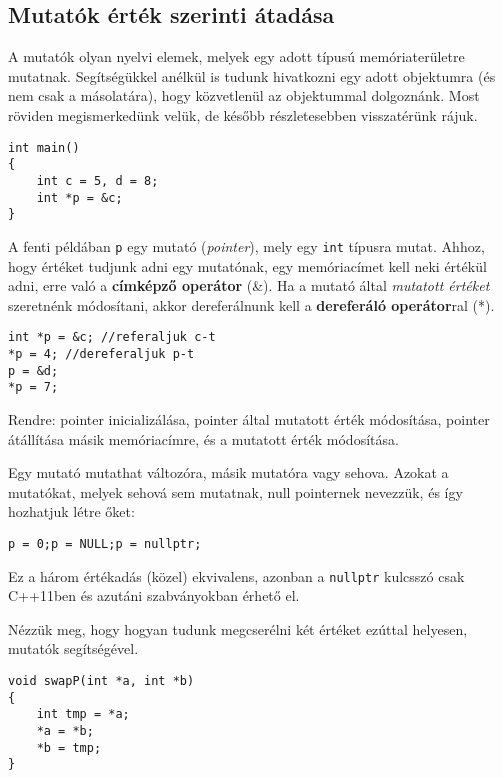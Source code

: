 \documentclass[a4paper,11.5pt]{article}
\begin{document}
	\subsection{Mutatók érték szerinti átadása}
	A mutatók olyan nyelvi elemek, melyek egy adott típusú memóriaterületre mutatnak. Segítségükkel anélkül is tudunk hivatkozni egy adott objektumra (és nem csak a másolatára), hogy közvetlenül az objektummal dolgoznánk. Most röviden megismerkedünk velük, de később részletesebben visszatérünk rájuk.
	\begin{lstlisting}
int main()
{
	int c = 5, d = 8;
	int *p = &c;
}
	\end{lstlisting}
	A fenti példában \texttt{p} egy mutató (\textit{pointer}), mely egy \texttt{int} típusra mutat. Ahhoz, hogy értéket tudjunk adni egy mutatónak, egy memóriacímet kell neki értékül adni, erre való a \textbf{címképző operátor} (\&). Ha a mutató által \textit{mutatott értéket} szeretnénk módosítani, akkor dereferálnunk kell a \textbf{dereferáló operátor}ral (*).
	\begin{lstlisting}
int *p = &c; //referaljuk c-t
*p = 4; //dereferaljuk p-t
p = &d;
*p = 7;
	\end{lstlisting}
	Rendre: pointer inicializálása, pointer által mutatott érték módosítása, pointer átállítása másik memóriacímre, és a mutatott érték módosítása.
	
	Egy mutató mutathat változóra, másik mutatóra vagy sehova. Azokat a mutatókat, melyek sehová sem mutatnak, null pointernek nevezzük, és így hozhatjuk létre őket:
	
	{\centering \texttt{p = 0;\quad \quad p = NULL;\quad \quad p = nullptr;} \par}
	
	\begin{note}
		Ez a három értékadás (közel) ekvivalens, azonban a \texttt{nullptr} kulcsszó csak C++11ben és azutáni szabványokban érhető el.
	\end{note}

  Nézzük meg, hogy hogyan tudunk megcserélni két értéket ezúttal helyesen, mutatók segítségével.
	
	\begin{lstlisting}
void swapP(int *a, int *b)
{
	int tmp = *a;
	*a = *b;
	*b = tmp;
}
	\end{lstlisting}
	
\end{document}
